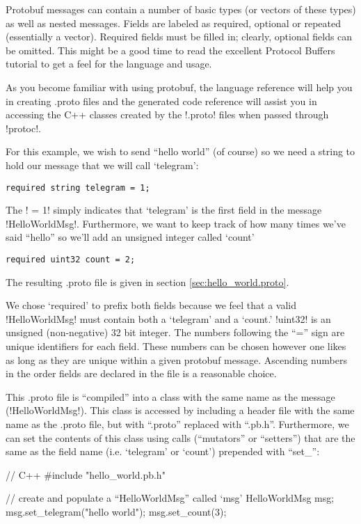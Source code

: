Protobuf messages can contain a number of basic types (or vectors of these types) as well as nested messages. Fields are labeled as required, optional or repeated (essentially a vector). Required fields must be filled in; clearly, optional fields can be omitted. This might be a good time to read the excellent Protocol Buffers tutorial \cite{proto-tutorial} to get a feel for the language and usage.

As you become familiar with using \gls{protobuf}, the language reference \cite{proto-lang-ref} will help you in creating .proto files and the generated code reference \cite{proto-gen-code} will assist you in accessing the C++ classes created by the !.proto! files when passed through !protoc!.

For this example, we wish to send ``hello world'' (of course) so we need a string to hold our message that we will call `telegram': 
\begin{verbatim}
required string telegram = 1;
\end{verbatim}
The ! = 1! simply indicates that `telegram' is the first field in the message !HelloWorldMsg!. Furthermore, we want to keep track of how many times we've said ``hello'' so we'll add an unsigned integer called `count'
\begin{verbatim}required uint32 count = 2;\end{verbatim}
The resulting .proto file is given in section \ref{sec:hello_world.proto}.

We chose `required' to prefix both fields because we feel that a valid !HelloWorldMsg! must contain both a `telegram' and a `count.' !uint32! is an unsigned (non-negative) 32 bit integer. The numbers following the ``='' sign are unique identifiers for each field. These numbers can be chosen however one likes as long as they are unique within a given protobuf message. Ascending numbers in the order fields are declared in the file is a reasonable choice.

This .proto file is ``compiled'' into a class with the same name as the message (!HelloWorldMsg!). This class is accessed by including a header file with the same name as the .proto file, but with ``.proto'' replaced with ``.pb.h''. Furthermore, we can set the contents of this class using calls (``mutators'' or ``setters'') that are the same as the field name (i.e. `telegram' or `count') prepended with ``set\_'':
\begin{boxedverbatim}
// C++ 
#include "hello_world.pb.h"

// create and populate a ``HelloWorldMsg'' called `msg'
HelloWorldMsg msg;
msg.set_telegram("hello world");
msg.set_count(3);
\end{boxedverbatim}
\resetbvlinenumber

